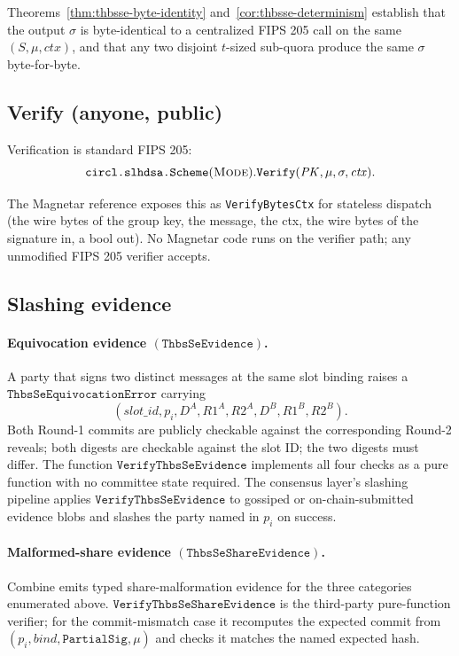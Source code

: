 Theorems~\ref{thm:thbsse-byte-identity}
and~\ref{cor:thbsse-determinism} establish that the output
$\sigma$ is byte-identical to a centralized FIPS 205 call on the
same $(S, \mu, \mathit{ctx})$, and that any two disjoint
$t$-sized sub-quora produce the same $\sigma$ byte-for-byte.

\subsection{Verify (anyone, public)}
\label{sec:thbsse:verify}

Verification is standard FIPS 205:
\begin{equation*}
  \texttt{circl.slhdsa.Scheme}(\textsc{Mode}).\texttt{Verify}(
    \mathit{PK}, \mu, \sigma, \mathit{ctx}).
\end{equation*}

The Magnetar reference exposes this as
\texttt{VerifyBytesCtx} for stateless dispatch (the wire bytes
of the group key, the message, the ctx, the wire bytes of the
signature in, a bool out). No Magnetar code runs on the
verifier path; any unmodified FIPS 205 verifier accepts.

\subsection{Slashing evidence}
\label{sec:thbsse:slashing}

\paragraph{Equivocation evidence
$(\texttt{ThbsSeEvidence})$.} A party that signs two distinct
messages at the same slot binding raises a
$\texttt{ThbsSeEquivocationError}$ carrying
\begin{equation*}
  (\mathit{slot\_id}, p_i, D^A, R1^A, R2^A,
  D^B, R1^B, R2^B).
\end{equation*}
Both Round-1 commits are publicly checkable against the
corresponding Round-2 reveals; both digests are checkable
against the slot ID; the two digests must differ. The function
$\texttt{VerifyThbsSeEvidence}$ implements all four checks as a
pure function with no committee state required. The consensus
layer's slashing pipeline applies $\texttt{VerifyThbsSeEvidence}$
to gossiped or on-chain-submitted evidence blobs and slashes the
party named in $p_i$ on success.

\paragraph{Malformed-share evidence
$(\texttt{ThbsSeShareEvidence})$.} Combine emits typed
share-malformation evidence for the three categories enumerated
above. $\texttt{VerifyThbsSeShareEvidence}$ is the third-party
pure-function verifier; for the commit-mismatch case it
recomputes the expected commit from
$(p_i, \mathit{bind}, \texttt{PartialSig}, \mu)$ and checks it
matches the named expected hash.

